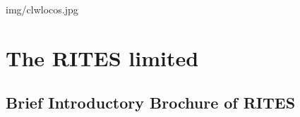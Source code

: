 \documentclass[11pt,twoside,openany,svgnames,x11names]{gkbookm1}
\begin{document}

{img/clwlocos.jpg}


\chapter[The RITES limited]{The RITES limited}
\renewcommand\chapterillustration{img/RITESlogo3.jpg}

\section{Brief Introductory Brochure of RITES}
 




%
\end{document}
